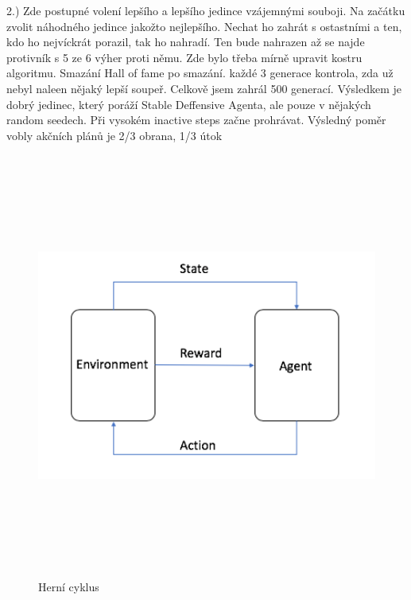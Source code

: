 2.) Zde postupné volení lepšího a lepšího jedince vzájemnými souboji.
Na začátku zvolit náhodného jedince jakožto nejlepšího. Nechat ho zahrát s ostastními a ten, kdo ho nejvíckrát porazil, tak ho nahradí.
Ten bude nahrazen až se najde protivník s 5 ze 6 výher proti němu.
Zde bylo třeba mírně upravit kostru algoritmu. Smazání Hall of fame po smazání.
každé 3 generace kontrola, zda už nebyl naleen nějaký lepší soupeř.
Celkově jsem zahrál 500 generací.
Výsledkem je dobrý jedinec, který poráží Stable Deffensive Agenta, ale pouze v nějakých random seedech. Při vysokém inactive steps začne prohrávat.
Výsledný poměr vobly akčních plánů je 2/3 obrana, 1/3 útok






\begin{figure}[p]\centering
\includegraphics[width=140mm, height=140mm]{./agent_enviroment}
\caption{Herní cyklus}
\label{obr03:Nhust}
\end{figure}

